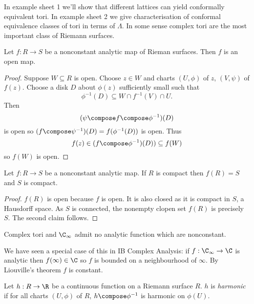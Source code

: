\documentclass[a4paper]{article}
\begin{document}
In example sheet 1 we'll show that different lattices can yield conformally equivalent tori. In example sheet 2 we give characterisation of conformal equivalence classes of tori in terms of \(\Lambda\). In some sense complex tori are the most important class of Riemann surfaces.

\begin{theorem}
  Let \(f: R \to S\) be a nonconstant analytic map of Rieman surfaces. Then \(f\) is an open map.
\end{theorem}

\begin{proof}
  Suppose \(W \subseteq R\) is open. Choose \(z \in W\) and charts \((U, \phi)\) of \(z\), \((V, \psi)\) of \(f(z)\). Choose a disk \(D\) about \(\phi(z)\) sufficiently small such that
  \[
    \phi^{-1}(D) \subseteq W \cap f^{-1}(V) \cap U.
  \]
  Then
  \[
    (\psi \compose f \compose \phi^{-1})(D)
  \]
  is open so \((f \compose \psi^{-1})(D) = f(\phi^{-1}(D))\) is open. Thus
  \[
    f(z) \in (f \compose \phi^{-1})(D)) \subseteq f(W)
  \]
  so \(f(W)\) is open.
\end{proof}

\begin{corollary}
  Let \(f: R \to S\) be a nonconstant analytic map. If \(R\) is compact then \(f(R) = S\) and \(S\) is compact.
\end{corollary}

\begin{proof}
  \(f(R)\) is open because \(f\) is open. It is also closed as it is compact in \(S\), a Hausdorff space. As \(S\) is connected, the nonempty clopen set \(f(R)\) is precisely \(S\). The second claim follows.
\end{proof}

\begin{corollary}
  Complex tori and \(\C_\infty\) admit no analytic function which are nonconstant.
\end{corollary}

We have seen a special case of this in IB Complex Analysis: if \(f: \C_\infty \to \C\) is analytic then \(f(\infty) \in \C\) so \(f\) is bounded on a neighbourhood of \(\infty\). By Liouville's theorem \(f\) is constant.

\begin{definition}
  Let \(h: R \to \R\) be a continuous function on a Riemann surface \(R\). \(h\) is \emph{harmonic} if for all charts \((U, \phi)\) of \(R\), \(h \compose \phi^{-1}\) is harmonic on \(\phi(U)\).
\end{definition}
\end{document}
